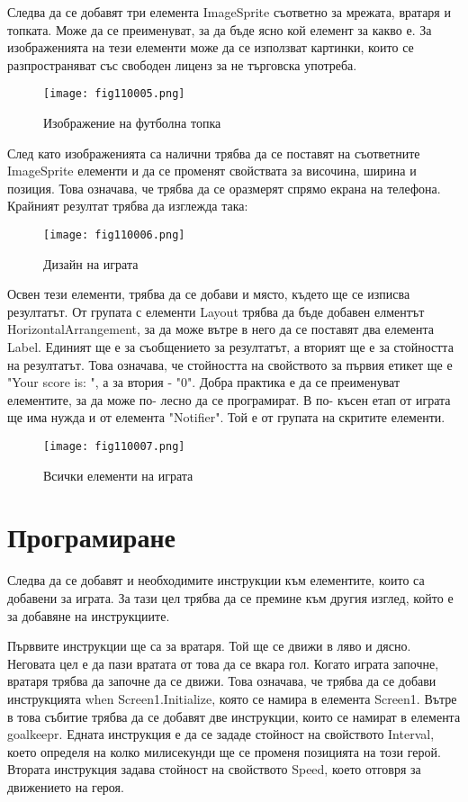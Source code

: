 Следва да се добавят три елемента ImageSprite съответно за мрежата, вратаря и топката. Може да се преименуват, за да бъде ясно кой елемент за какво е. За изображенията на тези елементи може да се използват картинки, които се разпространяват със свободен лиценз за не търговска употреба.

\begin{figure}[H]
  \centering
  \texttt{[image: fig110005.png]}
  \caption{Изображение на футболна топка}
\label{fig110005}
\end{figure}

След като изображенията са налични трябва да се поставят на съответните ImageSprite елементи и да се променят свойствата за височина, ширина и позиция. Това означава, че трябва да се оразмерят спрямо екрана на телефона. Крайният резултат трябва да изглежда така:

\begin{figure}[H]
  \centering
  \texttt{[image: fig110006.png]}
  \caption{Дизайн на играта}
\label{fig110006}
\end{figure}

Освен тези елементи, трябва да се добави и място, където ще се изписва резултатът. От групата с елементи Layout трябва да бъде добавен елментът HorizontalArrangement, за да може вътре в него да се поставят два елемента Label. Единият ще е за съобщението за резултатът, а вторият ще е за стойността на резултатът. Това означава, че стойността на свойството за първия етикет ще е "Your score is: ", а за втория - "0". Добра практика е да се преименуват елементите, за да може по- лесно да се програмират. В по- късен етап от играта ще има нужда и от елемента "Notifier". Той е от групата на скритите елементи.

\begin{figure}[H]
  \centering
  \texttt{[image: fig110007.png]}
  \caption{Всички елементи на играта}
\label{fig110007}
\end{figure}

\section{Програмиране}
Следва да се добавят и необходимите инструкции към елементите, които са добавени за играта. За тази цел трябва да се премине към другия изглед, който е за добавяне на инструкциите.

Първвите инструкции ще са за вратаря. Той ще се движи в ляво и дясно. Неговата цел е да пази вратата от това да се вкара гол. Когато играта започне, вратаря трябва да започне да се движи. Това означава, че трябва да се добави инструкцията when Screen1.Initialize, която се намира в елемента Screen1. Вътре в това събитие трябва да се добавят две инструкции, които се намират в елемента goalkeepr. Едната инструкция е да се зададе стойност на свойството Interval, което определя на колко милисекунди ще се променя позицията на този герой. Втората инструкция задава стойност на свойството Speed, което отговря за движението на героя.

